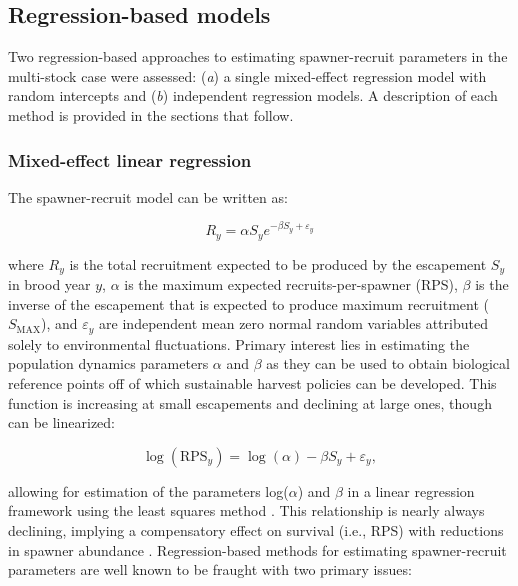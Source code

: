 \documentclass[12pt,]{book}
\theoremstyle{definition}
\theoremstyle{definition}
\theoremstyle{definition}
\theoremstyle{remark}
\begin{document}
\subsection{Regression-based models}\label{reg-methods}

\noindent
Two regression-based approaches to estimating \citet{ricker-1954}
spawner-recruit parameters in the multi-stock case were assessed:
(\emph{a}) a single mixed-effect regression model with random intercepts
and (\emph{b}) independent regression models. A description of each
method is provided in the sections that follow.

\subsubsection{Mixed-effect linear regression}\label{lme-methods}

\noindent
The \citet{ricker-1954} spawner-recruit model can be written as:

\begin{equation}
  R_y=\alpha S_y e^{-\beta S_y + \varepsilon_y}
  \label{eq:basic-ricker}
\end{equation}

\noindent
where \(R_y\) is the total recruitment expected to be produced by the
escapement \(S_y\) in brood year \(y\), \(\alpha\) is the maximum
expected recruits-per-spawner (RPS), \(\beta\) is the inverse of the
escapement that is expected to produce maximum recruitment
(\(S_{\text{MAX}}\)), and \(\varepsilon_y\) are independent mean zero
normal random variables attributed solely to environmental fluctuations.
Primary interest lies in estimating the population dynamics parameters
\(\alpha\) and \(\beta\) as they can be used to obtain biological
reference points off of which sustainable harvest policies can be
developed. This function is increasing at small escapements and
declining at large ones, though can be linearized:

\begin{equation}
  \log(\text{RPS}_y)=\log(\alpha)-\beta S_y + \varepsilon_y,
  \label{eq:lin-ricker-fixed}
\end{equation}

\noindent
allowing for estimation of the parameters log(\(\alpha\)) and \(\beta\)
in a linear regression framework using the least squares method
\citep{clark-etal-2009}. This relationship is nearly always declining,
implying a compensatory effect on survival (i.e., RPS) with reductions
in spawner abundance \citep{rose-etal-2001}. Regression-based methods
for estimating spawner-recruit parameters are well known to be fraught
with two primary issues:
\end{document}
